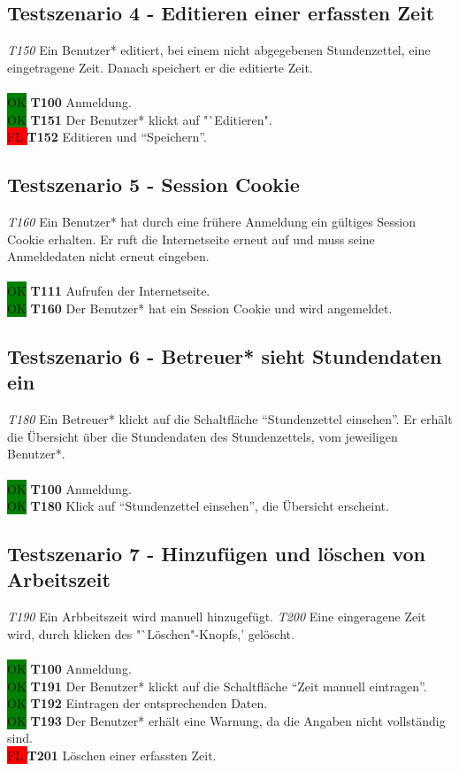 \subsection{Testszenario 4 - Editieren einer erfassten Zeit}
\emph{T150} Ein Benutzer* editiert, bei einem nicht abgegebenen Stundenzettel, eine eingetragene Zeit. Danach speichert er die editierte Zeit.
\\\\
\colorbox{green}{OK} \textbf{T100} Anmeldung. \\
\colorbox{green}{OK} \textbf{T151} Der Benutzer* klickt auf "`Editieren". \\
\colorbox{red}{FL } \textbf{T152} Editieren und "`Speichern"'.

\subsection{Testszenario 5 - Session Cookie}
\emph{T160} Ein Benutzer* hat durch eine frühere Anmeldung ein gültiges Session Cookie erhalten. Er ruft die Internetseite erneut auf und muss seine Anmeldedaten nicht erneut eingeben.
\\\\
\colorbox{green}{OK} \textbf{T111} Aufrufen der Internetseite. \\
\colorbox{green}{OK} \textbf{T160} Der Benutzer* hat ein Session Cookie und wird angemeldet.

\subsection{Testszenario 6 - Betreuer* sieht Stundendaten ein}
\emph{T180} Ein Betreuer* klickt auf die Schaltfläche "`Stundenzettel einsehen"'. Er erhält die Übersicht über die Stundendaten des Stundenzettels, vom jeweiligen Benutzer*.
\\\\
\colorbox{green}{OK} \textbf{T100} Anmeldung. \\
\colorbox{green}{OK} \textbf{T180} Klick auf "`Stundenzettel einsehen"', die Übersicht erscheint.

\subsection{Testszenario 7 - Hinzufügen und löschen von Arbeitszeit}
\emph{T190} Ein Arbbeitszeit wird manuell hinzugefügt. \emph{T200} Eine eingeragene Zeit wird, durch klicken des "`Löschen"-Knopfs,' gelöscht.
\\\\
\colorbox{green}{OK} \textbf{T100} Anmeldung. \\
\colorbox{green}{OK} \textbf{T191} Der Benutzer* klickt auf die Schaltfläche "`Zeit manuell eintragen"'. \\
\colorbox{green}{OK} \textbf{T192} Eintragen der entsprechenden Daten. \\
\colorbox{green}{OK} \textbf{T193} Der Benutzer* erhält eine Warnung, da die Angaben nicht vollständig sind. \\
\colorbox{red}{FL } \textbf{T201} Löschen einer erfassten Zeit.

